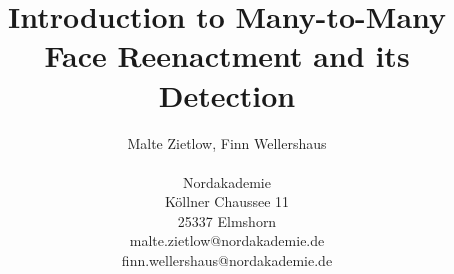 \documentclass{akdai}
\author{
	Malte Zietlow, Finn Wellershaus \\ 
	\\
	Nordakademie\\ 
	Köllner Chaussee 11\\ 
	25337 Elmshorn \\ 
	malte.zietlow@nordakademie.de \\
	finn.wellershaus@nordakademie.de
}
\theoremstyle{definition}
\begin{document}
\title{Introduction to Many-to-Many Face Reenactment and its Detection}
\maketitle

\listoftodos{}            %



% 







{\hypersetup{hidelinks}
    \printbibliography{}
    \printglossaries{}
}

\end{document}
